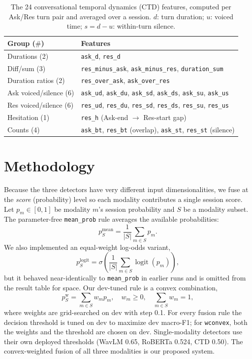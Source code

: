 \documentclass{article}
\begin{document}
\begin{table}[!t]
\centering
\caption{The 24 conversational temporal dynamics (CTD) features, computed per Ask/Res turn pair and averaged over a session. $d$: turn duration; $u$: voiced time; $s{=}d{-}u$: within-turn silence.}
\label{tab:ctd}
\fontsize{7}{9}\selectfont
\setlength{\tabcolsep}{3pt}
\vspace{-2mm}
\begin{tabular}{ll}
\toprule
Group ($\#$) & Features \\
\midrule
Durations (2) & \texttt{ask\_d}, \texttt{res\_d} \\
Diff/sum (3) & \texttt{res\_minus\_ask}, \texttt{ask\_minus\_res}, \texttt{duration\_sum} \\
Duration ratios (2) & \texttt{res\_over\_ask}, \texttt{ask\_over\_res} \\
Ask voiced/silence (6) & \texttt{ask\_ud}, \texttt{ask\_du}, \texttt{ask\_sd}, \texttt{ask\_ds}, \texttt{ask\_su}, \texttt{ask\_us} \\
Res voiced/silence (6) & \texttt{res\_ud}, \texttt{res\_du}, \texttt{res\_sd}, \texttt{res\_ds}, \texttt{res\_su}, \texttt{res\_us} \\
Hesitation (1) & \texttt{res\_h} (Ask-end $\to$ Res-start gap) \\
Counts (4) & \texttt{ask\_bt}, \texttt{res\_bt} (overlap), \texttt{ask\_st}, \texttt{res\_st} (silence) \\
\bottomrule
\end{tabular}
\vspace{-4mm}
\end{table}

\section{Methodology}
\vspace{-1mm}
\label{sec:fusion}
Because the three detectors have very different input dimensionalities, we fuse at the \emph{score} (probability) level so each modality contributes a single session score. Let $p_m \in [0,1]$ be modality $m$'s session probability and $S$ be a modality subset. The parameter-free \texttt{mean\_prob} rule averages the available probabilities:
\[
p_S^{\mathrm{mean}}
= \frac{1}{|S|}\sum_{m\in S} p_m .
\]
We also implemented an equal-weight log-odds variant,
\[
p_S^{\mathrm{logit}}
= \sigma\!\left(
\frac{1}{|S|}\sum_{m\in S}\operatorname{logit}(p_m)
\right),
\]
but it behaved near-identically to \texttt{mean\_prob} in earlier runs and is omitted from the result table for space. Our dev-tuned rule is a convex combination,
\[
p_S^{\mathrm{w}}
= \sum_{m\in S} w_m p_m,
\quad
w_m \geq 0,\quad
\sum_{m\in S} w_m = 1,
\]
where weights are grid-searched on dev with step 0.1. For every fusion rule the decision threshold is tuned on dev to maximize dev macro-F1; for \texttt{wconvex}, both the weights and the threshold are chosen on dev. Single-modality detectors use their own deployed thresholds (WavLM 0.65, RoBERTa 0.524, CTD 0.50). The convex-weighted fusion of all three modalities is our proposed system.
\end{document}
